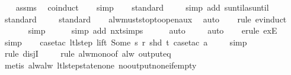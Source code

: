 \begin{isabellebody}
%
\isadelimproof
\ \ %
\endisadelimproof
%
\isatagproof
{}\isamarkupfalse%
\ assms\ \isamarkupfalse%
\ coinduct\isanewline
\ \ \isamarkupfalse%
\ simp\isanewline
\ \ \isamarkupfalse%
\ standard\isanewline
\ \ \ \isamarkupfalse%
\ {\isacharparenleft}simp\ add{\isacharcolon}\ suntil{\isacharunderscore}as{\isacharunderscore}until{\isacharparenright}\isanewline
\ \ \ \isamarkupfalse%
\ standard\isanewline
\ \ \ \isamarkupfalse%
\ standard\isanewline
\ \ \isamarkupfalse%
\ alw{\isacharunderscore}must{\isacharunderscore}stop{\isacharunderscore}to{\isacharunderscore}open{\isacharunderscore}aux\ \isamarkupfalse%
\ auto{\isacharbrackleft}{}{\isacharbrackright}\isanewline
\ \ \isamarkupfalse%
\ {\isacharparenleft}rule\ ev{\isachardot}induct{\isacharparenright}\isanewline
\ \ \ \ \ \isamarkupfalse%
\ simp\isanewline
\ \ \ \ \isamarkupfalse%
\ {\isacharparenleft}simp\ add{\isacharcolon}\ nxt{\isachardot}simps{\isacharparenright}\isanewline
\ \ \ \ \isamarkupfalse%
\ auto{\isacharbrackleft}{}{\isacharbrackright}\isanewline
\ \ \ \isamarkupfalse%
\ auto{\isacharbrackleft}{}{\isacharbrackright}\isanewline
\isanewline
\ \ \isamarkupfalse%
\ {\isacharparenleft}erule\ exE{\isacharparenright}{\isacharplus}\isanewline
\ \ \isamarkupfalse%
\ simp\isanewline
\ \ \isamarkupfalse%
\ {\isacharparenleft}case{\isacharunderscore}tac\ {\isachardoublequoteopen}ltl{\isacharunderscore}step\ lift\ {\isacharparenleft}Some\ s{\isacharparenright}\ r\ {\isacharparenleft}shd\ t{\isacharparenright}{\isachardoublequoteclose}{\isacharcomma}\ case{\isacharunderscore}tac\ a{\isacharparenright}\isanewline
\ \ \ \isamarkupfalse%
\ simp\isanewline
\ \ \ \isamarkupfalse%
\ {\isacharparenleft}rule\ disjI{}{\isacharparenright}\isanewline
\ \ \ \isamarkupfalse%
\ {\isacharparenleft}rule\ alw{\isacharunderscore}mono{\isacharbrackleft}of\ {\isachardoublequoteopen}alw\ {\isacharparenleft}output{\isacharunderscore}eq\ {\isacharbrackleft}{\isacharbrackright}{\isacharparenright}{\isachardoublequoteclose}{\isacharbrackright}{\isacharparenright}\isanewline
\ \ \ \ \isamarkupfalse%
\ {\isacharparenleft}metis\ alw{\isacharunderscore}alw\ ltl{\isacharunderscore}step{\isacharunderscore}state{\isacharunderscore}none\ no{\isacharunderscore}output{\isacharunderscore}none{\isacharunderscore}if{\isacharunderscore}empty{\isacharparenright}\isanewline

\end{isabellebody}
